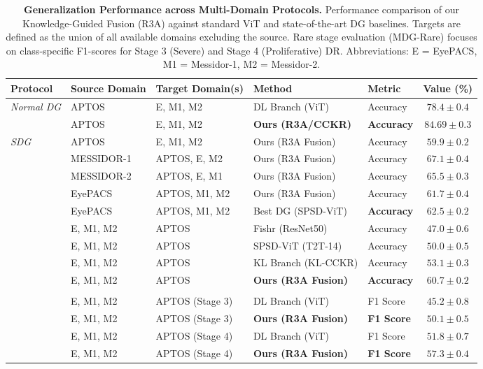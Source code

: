 \documentclass{article}
\begin{document}
\begin{table}[h] %
\centering
\scriptsize
\setlength{\tabcolsep}{5pt}
\renewcommand{\arraystretch}{1.2} %

\caption{\footnotesize \textbf{Generalization Performance across Multi-Domain Protocols.} 
Performance comparison of our Knowledge-Guided Fusion (R3A) against standard ViT and state-of-the-art DG baselines. 
Targets are defined as the union of all available domains excluding the source. 
Rare stage evaluation (MDG-Rare) focuses on class-specific F1-scores for Stage 3 (Severe) and Stage 4 (Proliferative) DR.
Abbreviations: E = EyePACS, M1 = Messidor-1, M2 = Messidor-2.}
\label{tab:dr_all_results}

\begin{tabular}{ll p{4.3cm} l l c}
\toprule
\textbf{Protocol} & \textbf{Source Domain} & \textbf{Target Domain(s)} & \textbf{Method} & \textbf{Metric} & \textbf{Value (\%)} \\
\midrule
\rowcolor[gray]{0.95} \textit{Normal DG} & APTOS & E, M1, M2 & DL Branch (ViT) & Accuracy & $78.4 \pm 0.4$ \\
& APTOS & E, M1, M2 & \textbf{Ours (R3A/CCKR)} & \textbf{Accuracy} & $\mathbf{84.69 \pm 0.3}$ \\
\midrule
\multirow{6}{*}{\textit{SDG}} 
& APTOS & E, M1, M2 & Ours (R3A Fusion) & Accuracy & $\mathbf{59.9 \pm 0.2}$ \\
& MESSIDOR-1 & APTOS, E, M2 & Ours (R3A Fusion) & Accuracy & $\mathbf{67.1 \pm 0.4}$ \\
& MESSIDOR-2 & APTOS, E, M1 & Ours (R3A Fusion) & Accuracy & $\mathbf{65.5 \pm 0.3}$ \\
& EyePACS & APTOS, M1, M2 & Ours (R3A Fusion) & Accuracy & $61.7 \pm 0.4$ \\
& EyePACS & APTOS, M1, M2 & Best DG (SPSD-ViT) & \textbf{Accuracy} & $\mathbf{62.5 \pm 0.2}$ \\
\midrule
\multirow{4}{*}{\textit{MDG}} 
& E, M1, M2 & APTOS & Fishr (ResNet50) & Accuracy & $47.0 \pm 0.6$ \\
& E, M1, M2 & APTOS & SPSD-ViT (T2T-14) & Accuracy & $50.0 \pm 0.5$ \\
& E, M1, M2 & APTOS & KL Branch (KL-CCKR) & Accuracy & $53.1 \pm 0.3$ \\
& E, M1, M2 & APTOS & \textbf{Ours (R3A Fusion)} & \textbf{Accuracy} & $\mathbf{60.7 \pm 0.2}$ \\
\midrule
\rowcolor[gray]{0.95} \multicolumn{6}{l}{\textit{MDG (Rare Stage Analysis - Severe DR Class 3 \& 4)}} \\
& E, M1, M2 & APTOS (Stage 3) & DL Branch (ViT) & F1 Score & $45.2 \pm 0.8$ \\
& E, M1, M2 & APTOS (Stage 3) & \textbf{Ours (R3A Fusion)} & \textbf{F1 Score} & $\mathbf{50.1 \pm 0.5}$ \\
& E, M1, M2 & APTOS (Stage 4) & DL Branch (ViT) & F1 Score & $51.8 \pm 0.7$ \\
& E, M1, M2 & APTOS (Stage 4) & \textbf{Ours (R3A Fusion)} & \textbf{F1 Score} & $\mathbf{57.3 \pm 0.4}$ \\
\bottomrule
\end{tabular}
\end{table}
\end{document}
